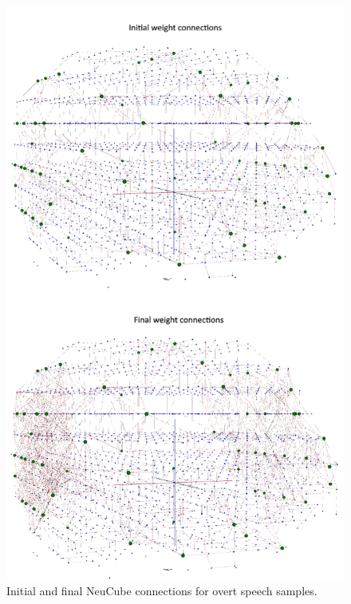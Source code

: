 \begin{figure}[h!]
\centering
\includegraphics[scale=0.77]{Figures/NeuCube_Connections_Overt.png}
\caption{Initial and final NeuCube connections for overt speech samples.}
\label{Fig: NeuCube_Connections_Overt}
\end{figure}


